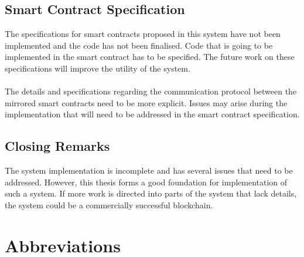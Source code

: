 \documentclass[a4paper,twoside,phd]{BYUPhys}
\begin{document}
\section{Smart Contract Specification}
The specifications for smart contracts proposed in this system have not been implemented and the code has not been finalised. Code that is going to be implemented in the smart contract has to be specified. The future work on these specifications will improve the utility of the system.
\\
\\
The details and specifications regarding the communication protocol between the mirrored smart contracts need to be more explicit. Issues may arise during the implementation that will need to be addressed in the smart contract specification.
\section{Closing Remarks}
The system implementation is incomplete and has several issues that need to be addressed. However, this thesis forms a good foundation for implementation of such a system. If more work is directed into parts of the system that lack details, the system could be a commercially successful blockchain. 
\label{chap:FutureWork}
\chapter{Abbreviations}
\label{chap:abbreviations}
\end{document}
